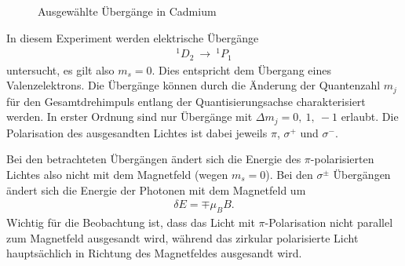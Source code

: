 \begin{figure}[h]
  \centering
  \caption{Ausgewählte Übergänge in Cadmium}
  \label{fig:level}
\end{figure}  

In diesem Experiment werden elektrische Übergänge 
\begin{align*}
^1D_2 \ \rightarrow  \ ^1P_1 
\end{align*}
untersucht, es gilt also $m_s=0$. Dies entspricht dem Übergang eines Valenzelektrons. Die Übergänge können durch die Änderung der Quantenzahl $m_j$ für den Gesamtdrehimpuls entlang der Quantisierungsachse charakterisiert werden. In erster Ordnung sind nur Übergänge mit $\Delta m_j=0, \ 1, \ -1$ erlaubt. Die Polarisation des ausgesandten Lichtes ist dabei jeweils $\pi$, $\sigma ^+$ und $\sigma^-$.

Bei den betrachteten Übergängen ändert sich die Energie des $\pi$-polarisierten Lichtes also nicht mit dem Magnetfeld (wegen $m_s=0$). Bei den $\sigma^{\pm}$ Übergängen ändert sich die Energie der Photonen mit dem Magnetfeld um
\begin{align}
  \delta E=\mp \mu_B B.
  \label{eq:de}
\end{align}
Wichtig für die Beobachtung ist, dass das Licht mit $\pi$-Polarisation nicht parallel zum Magnetfeld ausgesandt wird, während das zirkular polarisierte Licht hauptsächlich in Richtung des Magnetfeldes ausgesandt wird.
